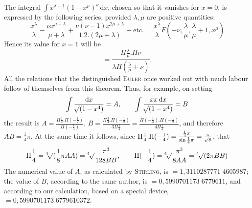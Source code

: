 The integral $\int x^{\lambda-1}(1-x^\mu)^\nu\,\mathrm{d}x$, chosen so that it vanishes for $x=0$, is expressed by the following series, provided $\lambda,\mu$ are positive quantities:
\[
\frac{x^\lambda}{\lambda}
-\frac{\nu x^{\mu+\lambda}}{\mu+\lambda}
+\frac{\nu(\nu-1)x^{2\mu+\lambda}}{1.2.(2\mu+\lambda)}
-\mathrm{etc.}
=\frac{x^\lambda}{\lambda}F(-\nu,\frac\lambda\mu,
\frac\lambda\mu+1,x^\mu)
\]
Hence its value for $x=1$ will be
\[
=\frac{\Pi\frac\lambda\mu.\Pi\nu}
{\lambda\Pi(\frac\lambda\mu+\nu)}.
\]
All the relations that the distinguished \textsc{Euler} once worked out with much labour follow of themselves from this theorem. Thus, for example, on setting
\[
\int\frac{\mathrm{d}x}{\BareRoot{(1-x^4)}}=A,\qquad
\int\frac{xx\,\mathrm{d}x}{\BareRoot{(1-x^4)}}=B
\]
the result is $A=\frac{\Pi\frac14.\Pi(-\frac12)}{\Pi(-\frac14)}$, $B=\frac{\Pi\frac34.\Pi(-\frac12)}{3\Pi\frac14}
=\frac{\Pi(-\frac14).\Pi(-\frac12)}{4\Pi\frac14}$, and therefore $AB=\frac14\pi$. At the same time it follows, since $\Pi\frac14.\Pi(-\frac14)=\frac{\frac14\pi}{\sin\frac14\pi}
=\frac\pi{\BareRoot{8}}$, that
\[
\Pi\frac14=\BareRoot[4]{(\frac18\pi AA)}
=\BareRoot[4]{\frac{\pi^3}{128BB}},\qquad
\Pi(-\frac14)=\BareRoot[4]{\frac{\pi^3}{8AA}}
=\BareRoot[4]{(2\pi BB)}
\]
The numerical value of $A$, as calculated by \textsc{Stirling}, is $=1{,}3110287771\;\allowbreak 4605987$; the value of $B$, according to the same author, is $=0{,}5990701173\;\allowbreak 6779611$, and according to our calculation, based on a special device, $=0{,}5990701173\;\allowbreak 6779610372$.

